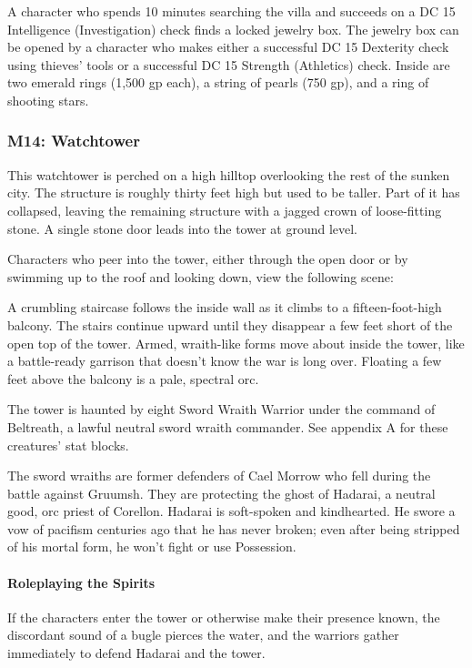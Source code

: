 \documentclass[10pt,a4paper,twoside,twocolumn,openany,nodeprecatedcode]{dndbook}
\begin{document}
A character who spends 10 minutes searching the villa and succeeds on a DC 15 Intelligence (Investigation) check finds a locked jewelry box. The jewelry box can be opened by a character who makes either a successful DC 15 Dexterity check using thieves' tools or a successful DC 15 Strength (Athletics) check. Inside are two emerald rings (1,500 gp each), a string of pearls (750 gp), and a ring of shooting stars.

\subsubsection{M14: Watchtower}
\begin{DndReadAloud}{}
This watchtower is perched on a high hilltop overlooking the rest of the sunken city. The structure is roughly thirty feet high but used to be taller. Part of it has collapsed, leaving the remaining structure with a jagged crown of loose-fitting stone. A single stone door leads into the tower at ground level.

\end{DndReadAloud}

Characters who peer into the tower, either through the open door or by swimming up to the roof and looking down, view the following scene:

\begin{DndReadAloud}{}
A crumbling staircase follows the inside wall as it climbs to a fifteen-foot-high balcony. The stairs continue upward until they disappear a few feet short of the open top of the tower. Armed, wraith-like forms move about inside the tower, like a battle-ready garrison that doesn't know the war is long over. Floating a few feet above the balcony is a pale, spectral orc.

\end{DndReadAloud}

The tower is haunted by eight Sword Wraith Warrior under the command of Beltreath, a lawful neutral sword wraith commander. See appendix A for these creatures' stat blocks.

The sword wraiths are former defenders of Cael Morrow who fell during the battle against Gruumsh. They are protecting the ghost of Hadarai, a neutral good, orc priest of Corellon. Hadarai is soft-spoken and kindhearted. He swore a vow of pacifism centuries ago that he has never broken; even after being stripped of his mortal form, he won't fight or use Possession.

\paragraph{Roleplaying the Spirits}
If the characters enter the tower or otherwise make their presence known, the discordant sound of a bugle pierces the water, and the warriors gather immediately to defend Hadarai and the tower.
\end{document}
